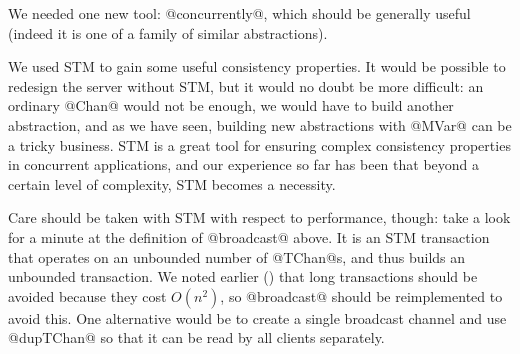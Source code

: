 We needed one new tool: @concurrently@, which should be generally
useful (indeed it is one of a family of similar abstractions).

We used STM to gain some useful consistency properties.  It would be
possible to redesign the server without STM, but it would no doubt be
more difficult: an ordinary @Chan@ would not be enough, we would have
to build another abstraction, and as we have seen, building new
abstractions with @MVar@ can be a tricky business.  STM is a great
tool for ensuring complex consistency properties in concurrent
applications, and our experience so far has been that beyond a certain
level of complexity, STM becomes a necessity.

Care should be taken with STM with respect to performance, though:
take a look for a minute at the definition of @broadcast@ above.  It
is an STM transaction that operates on an unbounded number of
@TChan@s, and thus builds an unbounded transaction.  We noted earlier
() that long transactions should be avoided because
they cost $O(n^2)$, so @broadcast@ should be reimplemented to avoid
this.  One alternative would be to create a single broadcast channel
and use @dupTChan@ so that it can be read by all clients separately.

